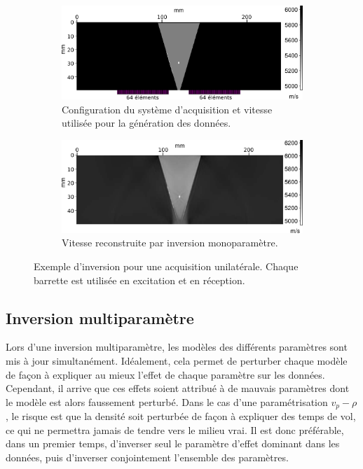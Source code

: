 \begin{figure}
	\begin{subfigure}[b]{0.5\textwidth}
		\centering
		\includegraphics[width=\textwidth]{img/config_reelle_true.png}
		\caption{Configuration du système d'acquisition et vitesse utilisée pour la génération des données.\label{app:iso:reel1}}	
	\end{subfigure}
	\hspace{0.2cm}
	\begin{subfigure}[b]{0.5\textwidth}
		\centering
		\includegraphics[width=\textwidth]{img/config_reelle_rec.png}
		\caption{Vitesse reconstruite par inversion monoparamètre. \label{app:iso:reel2}}	
	\end{subfigure}
	\caption{Exemple d'inversion pour une acquisition unilatérale. Chaque barrette est utilisée en excitation et en réception.}
\end{figure}

\subsection{Inversion multiparamètre}

Lors d'une inversion multiparamètre, les modèles des différents paramètres sont mis à jour simultanément. Idéalement, cela permet de perturber chaque modèle de façon à expliquer au mieux l'effet de chaque paramètre sur les données. Cependant, il arrive que ces effets soient attribué à de mauvais paramètres dont le modèle est alors faussement perturbé. Dans le cas d'une paramétrisation $v_{p}-\rho$, le risque est que la densité soit perturbée de façon à expliquer des temps de vol, ce qui ne permettra jamais de tendre vers le milieu vrai. Il est donc préférable, dans un premier temps, d'inverser seul le paramètre d'effet dominant dans les données, puis d'inverser conjointement l'ensemble des paramètres.\\

